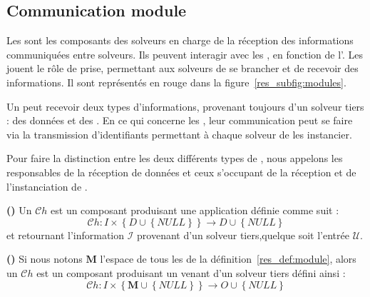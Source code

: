 \subsection{Communication module}

Les \infr{\opchs{}} sont  les composants des solveurs en charge  de la réception des informations communiquées entre solveurs. Ils  peuvent interagir avec les \infr{\oms}, en fonction de l'\infr{\as}. Les \infr{\opchs{}} jouent le rôle de prise, permettant aux solveurs de  se  brancher et de recevoir des informations. Il sont représentés en rouge dans la figure~\ref{res_subfig:modules}.

Un \infr{\opch{}} peut recevoir deux types d'informations, provenant toujours d'un solveur tiers : des données et des \infr{\oms}. En ce qui concerne les \oms, leur communication peut se faire via la  transmission d'identifiants permettant à chaque solveur de les instancier.

Pour faire la distinction entre  les deux différents types de \infr{\opchs}, nous appelons \infr{\dopch{}} les \infr{\opchs{}} responsables de la réception de données et \infr{\oopch{}} ceux s'occupant de la réception et de l'instanciation de \infr{\oms}.

\begin{lemma} \label{res_def:dopench} \textbf{()}
Un \infr{\dopch{}} $\mathcal{C}h$ est un composant produisant une application définie comme suit : 
\begin{equation}
\mathcal{C}h: I\times\left\{D\cup\left\{NULL\right\}\right\} \rightarrow D \cup \left\{NULL\right\}
\end{equation}
et retournant l'information  $\mathcal{I}$ provenant d'un solveur tiers,quelque soit l'entrée $\mathcal{U}$.
\end{lemma}

\begin{lemma}\label{res_def:oopench} \textbf{()} 
Si nous notons $\mathbf{M}$ l'espace  de  tous  les \infr{\oms{}} de la définition~\ref{res_def:module}, alors un \infr{\oopch{}} $\mathcal{C}h$ est  un composant produisant un \infr{\om{}}  venant d'un solveur tiers défini ainsi :
\begin{equation}
\mathcal{C}h:I\times\left\{\mathbf{M}\cup\left\{NULL\right\}\right\} \rightarrow O\cup\left\{NULL\right\}
\end{equation}
\end{lemma}

